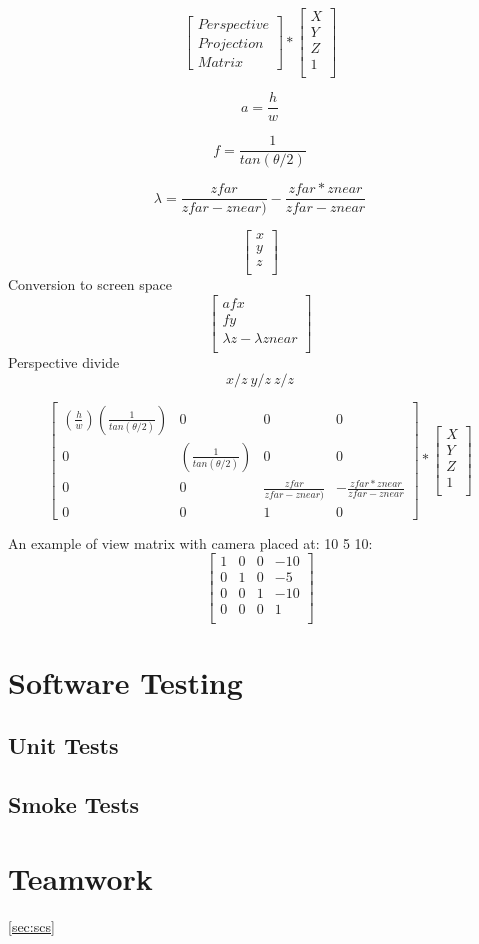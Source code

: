 \[
\begin{bmatrix}
Perspective\\
Projection \\
Matrix
\end{bmatrix} 
*
\begin{bmatrix}
X\\
Y\\
Z\\
1\\
\end{bmatrix} 
\]

\[
a=\frac{h}{w}
\]

\[
f=\frac{1}{tan(\theta / 2)}
\]

\[
\lambda=\frac{zfar}{zfar - znear)}
-
\frac{zfar * znear}{zfar-znear}
\]

\[
\begin{bmatrix}
x\\
y\\
z\\
\end{bmatrix}
\]
Conversion to screen space
\[
\begin{bmatrix}
afx\\
fy\\
\lambda z-\lambda znear\\
\end{bmatrix}
\]
Perspective divide
\[
x/z\ y/z\ z/z
\]

\[
\begin{bmatrix}
(\frac{h}{w})(\frac{1}{tan(\theta/2)}) & 0 & 0 & 0\\
0 & (\frac{1}{tan(\theta/2)}) & 0 & 0\\
0 & 0 & \frac{zfar}{zfar - znear)} & -\frac{zfar * znear}{zfar-znear}\\
0 & 0 & 1 & 0
\end{bmatrix} 
*
\begin{bmatrix}
X\\
Y\\
Z\\
1\\
\end{bmatrix} 
\]

An example of view matrix with camera placed at: 10 5 10:
\[
\begin{bmatrix}
1 & 0 & 0 & -10\\
0 & 1 & 0 & -5\\
0 & 0 & 1 & -10\\
0 & 0 & 0 & 1\\
\end{bmatrix} 
\]

\newpage
\section{Software Testing}
\label{sec:testing}
\subsection{Unit Tests} %
\subsection{Smoke Tests}
\newpage
\section{Teamwork}
\label{sec:teamwork}
\hyperref[sec:scs]{\ref*{sec:scs}} %